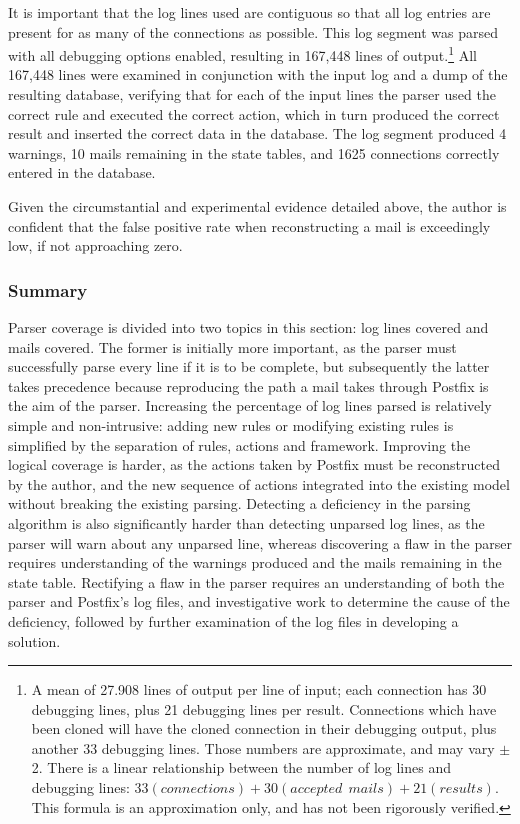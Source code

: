 It is important that the log lines used are contiguous so that all log
entries are present for as many of the connections as possible.  This log
segment was parsed with all debugging options enabled, resulting in 167,448
lines of output.\footnote{A mean of 27.908 lines of output per line of
input; each connection has 30 debugging lines, plus 21 debugging lines per
result.  Connections which have been cloned will have the cloned connection
in their debugging output, plus another 33 debugging lines.  Those numbers
are approximate, and may vary $\pm{}$ 2.  There is a linear relationship
between the number of log lines and debugging lines: $33(connections) +
30(accepted~~mails) + 21(results)$.  This formula is an approximation only,
and has not been rigorously verified.}  All 167,448 lines were examined in
conjunction with the input log and a dump of the resulting database,
verifying that for each of the input lines the parser used the correct rule
and executed the correct action, which in turn produced the correct result
and inserted the correct data in the database.  The log segment produced 4
warnings, 10 mails remaining in the state tables, and 1625 connections
correctly entered in the database.

Given the circumstantial and experimental evidence detailed above, the
author is confident that the false positive rate when reconstructing a mail
is exceedingly low, if not approaching zero.

\subsubsection{Summary}

Parser coverage is divided into two topics in this section: log lines
covered and mails covered.  The former is initially more important, as the
parser must successfully parse every line if it is to be complete, but
subsequently the latter takes precedence because reproducing the path a
mail takes through Postfix is the aim of the parser.  Increasing the
percentage of log lines parsed is relatively simple and non-intrusive:
adding new rules or modifying existing rules is simplified by the
separation of rules, actions and framework.  Improving the logical coverage
is harder, as the actions taken by Postfix must be reconstructed by the
author, and the new sequence of actions integrated into the existing model
without breaking the existing parsing.  Detecting a deficiency in the
parsing algorithm is also significantly harder than detecting unparsed log
lines, as the parser will warn about any unparsed line, whereas discovering
a flaw in the parser requires understanding of the warnings produced and
the mails remaining in the state table.  Rectifying a flaw in the parser
requires an understanding of both the parser and Postfix's log files, and
investigative work to determine the cause of the deficiency, followed by
further examination of the log files in developing a solution.

